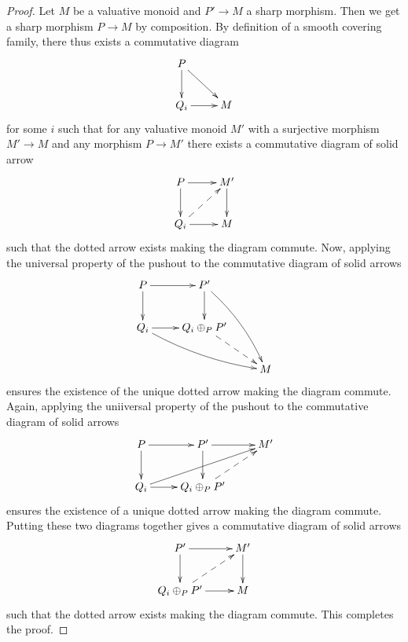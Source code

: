 \documentclass[12pt]{amsart}
\numberwithin{equation}{section}
\theoremstyle{plain}
\theoremstyle{remark}
\begin{document}
\begin{proof}
	Let $M$ be a valuative monoid and $P'\to M$ a sharp morphism. Then we get a sharp morphism $P\to M$ by composition. By definition of a smooth covering family, there thus exists a commutative diagram
$$\xymatrix{
	P\ar[dr]\ar[d] & \\
	Q_i\ar[r] & M }$$
for some $i$ such that for any valuative monoid $M'$ with a surjective morphism $M'\to M$ and any morphism $P\to M'$ there exists a commutative diagram of solid arrow
$$\xymatrix{
	P\ar[d]\ar[r] & M'\ar[d]\\
	Q_i\ar[r]\ar@{-->}[ur] & M }$$
such that the dotted arrow exists making the diagram commute. Now, applying the universal property of the pushout to the commutative diagram of solid arrows
$$\xymatrix{
	P\ar[r]\ar[d] & P' \ar@/^/[ddr]\ar[d] & \\
	Q_i\ar[r]\ar@/_/[drr]& Q_i\oplus_P P'\ar@{-->}[dr] &\\
	 & & M }$$
ensures the existence of the unique dotted arrow making the diagram commute. Again, applying the uniiversal property of the pushout to the commutative diagram of solid arrows
$$\xymatrix{
	P \ar[r]\ar[d] & P'\ar[r]\ar[d] & M'\\
	Q_i\ar[r]\ar[urr] & Q_i\oplus_P P'\ar@{-->}[ur]}$$
ensures the existence of a unique dotted arrow making the diagram commute. Putting these two diagrams together gives a commutative diagram of solid arrows
$$\xymatrix{
	P' \ar[r]\ar[d] & M'\ar[d]\\
	Q_i\oplus_P P'\ar[r]\ar@{-->}[ur] & M}$$
such that the dotted arrow exists making the diagram commute. This completes the proof.
\end{proof}
\end{document}

